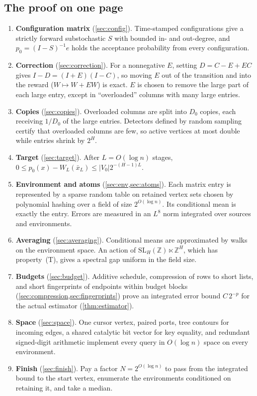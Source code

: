 \documentclass[11pt]{article}
\theoremstyle{definition}
\theoremstyle{remark}
\newcommand{\abs}[1]{\lvert #1\rvert}
\begin{document}
\subsection{The proof on one page}\label{sec:onepage}

\begin{enumerate}[leftmargin=*]
\item \textbf{Configuration matrix} (\cref{sec:config}). Time-stamped
  configurations give a strictly forward substochastic $S$ with bounded in- and
  out-degree, and $p_0=(I-S)^{-1}e$ holds the acceptance probability from every
  configuration.
\item \textbf{Correction} (\cref{sec:correction}). For a nonnegative $E$, setting
  $D=C-E+EC$ gives $I-D=(I+E)(I-C)$, so moving $E$ out of the transition and into
  the reward ($W\mapsto W+EW$) is exact. $E$ is chosen to remove the large part of
  each large entry, except in ``overloaded'' columns with many large entries.
\item \textbf{Copies} (\cref{sec:copies}). Overloaded columns are split into $D_0$
  copies, each receiving $1/D_0$ of the large entries. Detectors defined by
  random sampling certify that overloaded columns are few, so active vertices at
  most double while entries shrink by $2^H$.
\item \textbf{Target} (\cref{sec:target}). After $L=O(\log n)$ stages,
  $0\le p_0(x)-W_L(\bar x_L)\le\abs{V_0}2^{-(H-1)L}$.
\item \textbf{Environment and atoms} (\cref{sec:env,sec:atoms}). Each matrix
  entry is represented by a sparse random table on retained vertex sets chosen by
  polynomial hashing over a field of size $2^{O(\log n)}$. Its conditional mean is
  exactly the entry. Errors are measured in an $L^8$ norm integrated over sources
  and environments.
\item \textbf{Averaging} (\cref{sec:averaging}). Conditional means are
  approximated by walks on the environment space. An action of
  $\mathrm{SL}_H(\mathbb Z)\ltimes\mathbb Z^H$, which has property~(T), gives a
  spectral gap uniform in the field size.
\item \textbf{Budgets} (\cref{sec:budget}). Additive schedule, compression of
  rows to short lists, and short fingerprints of endpoints within budget blocks
  (\cref{sec:compression,sec:fingerprints}) prove an integrated error bound
  $C\,2^{-p}$ for the actual estimator (\cref{thm:estimator}).
\item \textbf{Space} (\cref{sec:space}). One cursor vertex, paired ports, tree
  contours for incoming edges, a shared catalytic bit vector for key equality,
  and redundant signed-digit arithmetic implement every query in $O(\log n)$
  space on every environment.
\item \textbf{Finish} (\cref{sec:finish}). Pay a factor $N=2^{O(\log n)}$ to pass
  from the integrated bound to the start vertex, enumerate the environments
  conditioned on retaining it, and take a median.
\end{enumerate}
\end{document}
